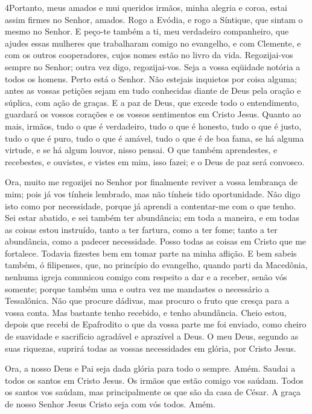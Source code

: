 \lettrine{4} Portanto, meus amados e mui queridos irmãos,
minha alegria e coroa, estai assim firmes no Senhor, amados.
Rogo a Evódia, e rogo a Síntique, que sintam o mesmo no Senhor.
E peço-te também a ti, meu verdadeiro companheiro, que ajudes
essas mulheres que trabalharam comigo no evangelho, e com Clemente,
e com os outros cooperadores, cujos nomes estão no livro da vida.
Regozijai-vos sempre no Senhor; outra vez digo, regozijai-vos.
Seja a vossa eqüidade notória a todos os homens. Perto está o
Senhor. Não estejais inquietos por coisa alguma; antes as vossas
petições sejam em tudo conhecidas diante de Deus pela oração e
súplica, com ação de graças. E a paz de Deus, que excede todo o
entendimento, guardará os vossos corações e os vossos sentimentos em
Cristo Jesus. Quanto ao mais, irmãos, tudo o que é verdadeiro,
tudo o que é honesto, tudo o que é justo, tudo o que é puro, tudo o
que é amável, tudo o que é de boa fama, se há alguma virtude, e se
há algum louvor, nisso pensai. O que também aprendestes, e
recebestes, e ouvistes, e vistes em mim, isso fazei; e o Deus de paz
será convosco.

Ora, muito me regozijei no Senhor por finalmente reviver a vossa
lembrança de mim; pois já vos tínheis lembrado, mas não tínheis tido
oportunidade. Não digo isto como por necessidade, porque já
aprendi a contentar-me com o que tenho. Sei estar abatido, e
sei também ter abundância; em toda a maneira, e em todas as coisas
estou instruído, tanto a ter fartura, como a ter fome; tanto a ter
abundância, como a padecer necessidade. Posso todas as coisas
em Cristo que me fortalece. Todavia fizestes bem em tomar
parte na minha aflição. E bem sabeis também, ó filipenses,
que, no princípio do evangelho, quando parti da Macedônia, nenhuma
igreja comunicou comigo com respeito a dar e a receber, senão vós
somente; porque também uma e outra vez me mandastes o
necessário a Tessalônica. Não que procure dádivas, mas
procuro o fruto que cresça para a vossa conta. Mas bastante
tenho recebido, e tenho abundância. Cheio estou, depois que recebi
de Epafrodito o que da vossa parte me foi enviado, como cheiro de
suavidade e sacrifício agradável e aprazível a Deus. O meu
Deus, segundo as suas riquezas, suprirá todas as vossas necessidades
em glória, por Cristo Jesus.

Ora, a nosso Deus e Pai seja dada glória para todo o sempre.
Amém. Saudai a todos os santos em Cristo Jesus. Os irmãos que
estão comigo vos saúdam. Todos os santos vos saúdam, mas
principalmente os que são da casa de César. A graça de nosso
Senhor Jesus Cristo seja com vós todos. Amém.

